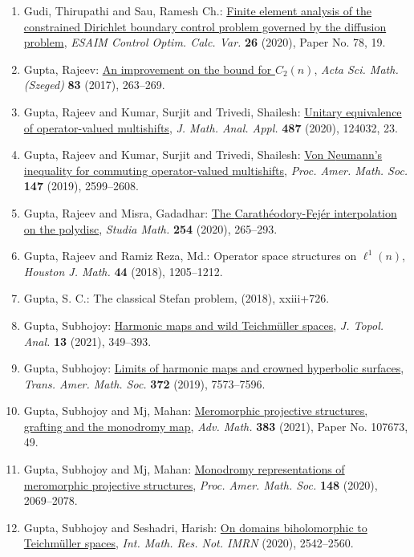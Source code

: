 \begin{enumerate}
\item Gudi, Thirupathi and Sau, Ramesh Ch.: \href{https://doi.org/10.1051/cocv/2019068}{Finite element analysis of the constrained {D}irichlet
boundary control problem governed by the diffusion problem}, \emph{ESAIM Control Optim. Calc. Var.} {\bf 26} (2020), Paper No. 78, 19.
\item Gupta, Rajeev: \href{https://doi.org/10.14232/actasm-015-088-4}{An improvement on the bound for {$C_2(n)$}}, \emph{Acta Sci. Math. (Szeged)} {\bf 83} (2017), 263--269.
\item Gupta, Rajeev and Kumar, Surjit and Trivedi, Shailesh: \href{https://doi.org/10.1016/j.jmaa.2020.124032}{Unitary equivalence of operator-valued multishifts}, \emph{J. Math. Anal. Appl.} {\bf 487} (2020), 124032, 23.
\item Gupta, Rajeev and Kumar, Surjit and Trivedi, Shailesh: \href{https://doi.org/10.1090/proc/14410}{Von {N}eumann's inequality for commuting operator-valued
multishifts}, \emph{Proc. Amer. Math. Soc.} {\bf 147} (2019), 2599--2608.
\item Gupta, Rajeev and Misra, Gadadhar: \href{https://doi.org/10.4064/sm190314-18-8}{The {C}arath\'{e}odory-{F}ej\'{e}r interpolation on the polydisc}, \emph{Studia Math.} {\bf 254} (2020), 265--293.
\item Gupta, Rajeev and Ramiz Reza, Md.: Operator space structures on {$\ell^1(n)$}, \emph{Houston J. Math.} {\bf 44} (2018), 1205--1212.
\item Gupta, S. C.: The classical {S}tefan problem, \emph{} {\bf } (2018), xxiii+726.
\item Gupta, Subhojoy: \href{https://doi.org/10.1142/S1793525320500156}{Harmonic maps and wild {T}eichm\"{u}ller spaces}, \emph{J. Topol. Anal.} {\bf 13} (2021), 349--393.
\item Gupta, Subhojoy: \href{https://doi.org/10.1090/tran/7777}{Limits of harmonic maps and crowned hyperbolic surfaces}, \emph{Trans. Amer. Math. Soc.} {\bf 372} (2019), 7573--7596.
\item Gupta, Subhojoy and Mj, Mahan: \href{https://doi.org/10.1016/j.aim.2021.107673}{Meromorphic projective structures, grafting and the monodromy
map}, \emph{Adv. Math.} {\bf 383} (2021), Paper No. 107673, 49.
\item Gupta, Subhojoy and Mj, Mahan: \href{https://doi.org/10.1090/proc/14866}{Monodromy representations of meromorphic projective
structures}, \emph{Proc. Amer. Math. Soc.} {\bf 148} (2020), 2069--2078.
\item Gupta, Subhojoy and Seshadri, Harish: \href{https://doi.org/10.1093/imrn/rny204}{On domains biholomorphic to {T}eichm\"{u}ller spaces}, \emph{Int. Math. Res. Not. IMRN} {\bf } (2020), 2542--2560.

\end{enumerate}
